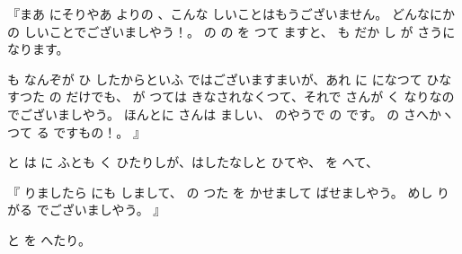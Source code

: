 『まあ
にそりやあ
よりの
、こんな
しいことはもうございません。
どんなにか
の
しいことでございましやう！。
の
の
を
つて
ますと、
も
だか
し
が
さうになります。

も
なんぞが
ひ
したからといふ
ではございますまいが、あれ
に
になつて
ひなすつた
の
だけでも、
が
つては
きなされなくつて、それで
さんが
く
なりなのでございましやう。
ほんとに
さんは
ましい、
のやうで
の
です。
の
さへかヽつて
る
ですもの！。
』

と
は
に
ふとも
く
ひたりしが、はしたなしと
ひてや、
を
へて、

『
りましたら
にも
しまして、
の
つた
を
かせまして
ばせましやう。
めし
り
がる
でございましやう。
』

と
を
へたり。


